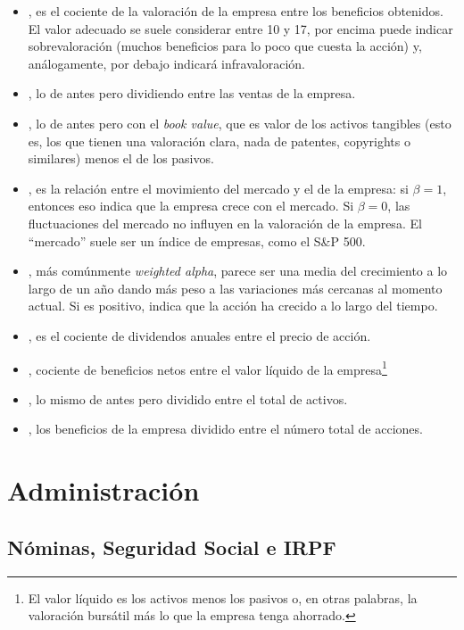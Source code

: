 \documentclass[nochap,palatino,notitlepage]{apuntes}
\begin{document}
\begin{itemize}
\item {}, es el cociente de la valoración de la empresa entre los beneficios obtenidos. El valor adecuado se suele considerar entre 10 y 17, por encima puede indicar sobrevaloración (muchos beneficios para lo poco que cuesta la acción) y, análogamente, por debajo indicará infravaloración.
\item {}, lo de antes pero dividiendo entre las ventas de la empresa.
\item {}, lo de antes pero con el \textit{book value}, que es valor de los activos tangibles (esto es, los que tienen una valoración clara, nada de patentes, copyrights o similares) menos el de los pasivos.
\item {}, es la relación entre el movimiento del mercado y el de la empresa: si $β = 1$, entonces eso indica que la empresa crece con el mercado. Si $β=0$, las fluctuaciones del mercado no influyen en la valoración de la empresa. El ``mercado'' suele ser un índice de empresas, como el S\&P 500.
\item {}, más comúnmente \textit{weighted alpha}, parece ser una media del crecimiento a lo largo de un año dando más peso a las variaciones más cercanas al momento actual. Si es positivo, indica que la acción ha crecido a lo largo del tiempo.
\item {}, es el cociente de dividendos anuales entre el precio de acción.
\item {}, cociente de beneficios netos entre el valor líquido de la empresa\footnote{El valor líquido es los activos menos los pasivos o, en otras palabras, la valoración bursátil más lo que la empresa tenga ahorrado.}
\item {}, lo mismo de antes pero dividido entre el total de activos.
\item {}, los beneficios de la empresa dividido entre el número total de acciones.
\end{itemize}

\section{Administración}

\subsection{Nóminas, Seguridad Social e IRPF}
\end{document}
